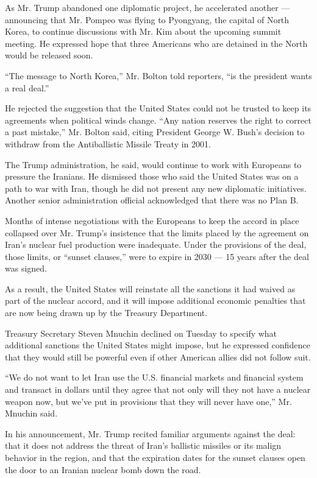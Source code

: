 As Mr. Trump abandoned one diplomatic project, he accelerated another
--- announcing that Mr. Pompeo was flying to Pyongyang, the capital of
North Korea, to continue discussions with Mr. Kim about the upcoming
summit meeting. He expressed hope that three Americans who are detained
in the North would be released soon.

``The message to North Korea,'' Mr. Bolton told reporters, ``is the
president wants a real deal.''

He rejected the suggestion that the United States could not be trusted
to keep its agreements when political winds change. ``Any nation
reserves the right to correct a past mistake,'' Mr. Bolton said, citing
President George W. Bush's decision to withdraw from the Antiballistic
Missile Treaty in 2001.

The Trump administration, he said, would continue to work with Europeans
to pressure the Iranians. He dismissed those who said the United States
was on a path to war with Iran, though he did not present any new
diplomatic initiatives. Another senior administration official
acknowledged that there was no Plan B.

Months of intense negotiations with the Europeans to keep the accord in
place collapsed over Mr. Trump's insistence that the limits placed by
the agreement on Iran's nuclear fuel production were inadequate. Under
the provisions of the deal, those limits, or ``sunset clauses,'' were to
expire in 2030 --- 15 years after the deal was signed.

As a result, the United States will reinstate all the sanctions it had
waived as part of the nuclear accord, and it will impose additional
economic penalties that are now being drawn up by the Treasury
Department.

Treasury Secretary Steven Mnuchin declined on Tuesday to specify what
additional sanctions the United States might impose, but he expressed
confidence that they would still be powerful even if other American
allies did not follow suit.

``We do not want to let Iran use the U.S. financial markets and
financial system and transact in dollars until they agree that not only
will they not have a nuclear weapon now, but we've put in provisions
that they will never have one,'' Mr. Mnuchin said.

In his announcement, Mr. Trump recited familiar arguments against the
deal: that it does not address the threat of Iran's ballistic missiles
or its malign behavior in the region, and that the expiration dates for
the sunset clauses open the door to an Iranian nuclear bomb down the
road.

